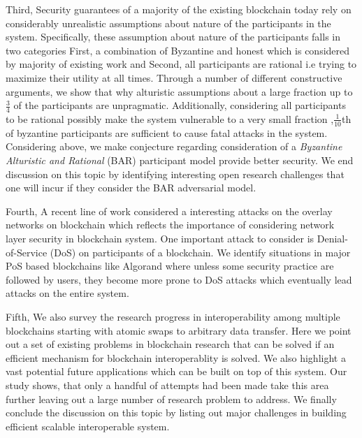 Third, Security guarantees of a majority of the existing blockchain today rely on considerably unrealistic assumptions about nature of the participants in the system. 
Specifically, these assumption about nature of the participants falls in two categories First, a combination of Byzantine and honest which is considered by majority of existing work and Second, all participants are rational i.e trying to maximize their utility at all times. 
Through a number of different constructive arguments, we show that why alturistic assumptions about a large fraction up to $\frac{3}{4}$ of the participants are unpragmatic. 
Additionally, considering all participants to be rational possibly make the system vulnerable to a very small fraction ,$\frac{1}{10}$th of byzantine participants are sufficient to cause fatal attacks in the system.
Considering above, we make conjecture regarding consideration of a {\em Byzantine Alturistic and Rational} (BAR) participant model provide better security. We end discussion on this topic by identifying interesting open research challenges that one will incur if they consider the BAR adversarial model. 


Fourth, A recent line of work considered a interesting attacks on the overlay networks on blockchain \cite{apostolaki2017hijacking, heilman2015eclipse} which reflects the importance of considering network layer security in blockchain system. One important attack to consider is Denial-of-Service (DoS) on participants of a blockchain. We identify situations in major PoS based blockchains like Algorand \cite{gilad2017algorand} where unless some security practice are followed by users, they become more prone to DoS attacks which eventually lead attacks on the entire system. 

Fifth, We also survey the research progress in interoperability among multiple blockchains starting with atomic swaps to arbitrary data transfer. Here we point out a set of existing problems in blockchain research that can be solved if an efficient mechanism for blockchain interoperablity is solved. We also highlight a vast potential future applications which can be built on top of this system. Our study shows, that only a handful of attempts had been made take this area further leaving out a large number of research problem to address. We finally conclude the discussion on this topic by listing out major challenges in building efficient scalable interoperable system.


